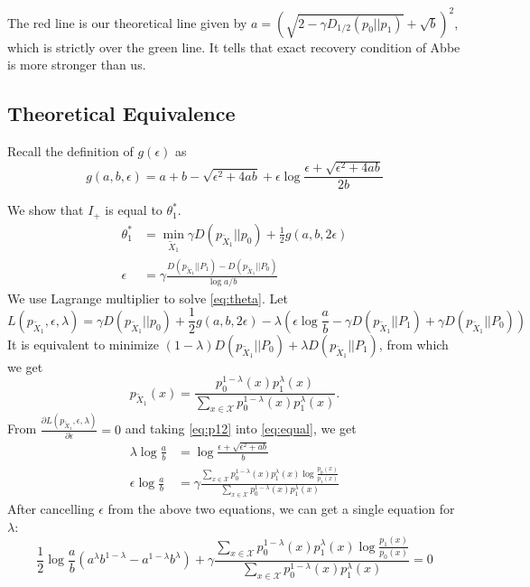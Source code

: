 \documentclass{article}
\begin{document}
The red line is our theoretical line
given by $a=(\sqrt{2 - \gamma D_{1/2}(p_0||p_1)} + \sqrt{b})^2$,
which is strictly over the green line. It tells that
exact recovery condition of Abbe is more stronger than us.
\subsection{Theoretical Equivalence}
Recall the definition of $g(\epsilon)$ as
	\begin{equation}\label{eq:gab}
	g(a,b,\epsilon) = a + b - \sqrt{\epsilon^2 + 4ab} + \epsilon \log \frac{\epsilon + \sqrt{\epsilon^2 + 4ab}}{2b}
	\end{equation}
	
We show that $I_+$ is equal to $\theta_1^*$.
\begin{align}
\theta^*_1 &= \min_{\widetilde{X}_1} \gamma D(p_{\widetilde{X}_1}|| p_0)+ \frac{1}{2} g(a,b, 2\epsilon)  \label{eq:theta}\\
\epsilon &= \gamma \frac{D(p_{\widetilde{X}_1} || P_1) - D(p_{\widetilde{X}_1} || P_0) }{\log a /b}\label{eq:equal}
\end{align}
We use Lagrange multiplier to solve \eqref{eq:theta}.
Let
$$
L(p_{\widetilde{X}_1},\epsilon, \lambda)
=\gamma D(p_{\widetilde{X}_1}|| p_0)+ \frac{1}{2} g(a,b, 2\epsilon) - \lambda(\epsilon \log\frac{a}{b}-\gamma
D(p_{\widetilde{X}_1} || P_1) + \gamma D(p_{\widetilde{X}_1} || P_0))
$$
It is equivalent to minimize
$(1-\lambda)D(p_{\widetilde{X}_1} || P_0) +
\lambda D(p_{\widetilde{X}_1} || P_1) $, from
which we get
\begin{equation}\label{eq:p12}
p_{\widetilde{X}_1}(x) = \frac{p_0^{1-\lambda}(x)p_1^{\lambda}(x)}{\sum_{x \in \mathcal{X}}p_0^{1-\lambda}(x) p_1^{\lambda} (x)}.
\end{equation}
From $\frac{\partial L(p_{\widetilde{X}_1},\epsilon, \lambda)}{\partial \epsilon}=0$ and taking \eqref{eq:p12}
into \eqref{eq:equal}, we get
\begin{align*}
    \lambda \log \frac{a}{b}
    & = \log \frac{\epsilon + \sqrt{\epsilon^2+ab}}{b} \\
    \epsilon \log \frac{a}{b}
    & = \gamma\frac{\sum_{x \in \mathcal{X}}p_0^{1-\lambda}(x) p_1^{\lambda} (x)\log \frac{p_0(x)}{p_1(x)}}{\sum_{x \in \mathcal{X}}p_0^{1-\lambda}(x) p_1^{\lambda} (x)}
\end{align*}
After cancelling $\epsilon$
from the above two equations, we can get a single equation
for $\lambda$:
\begin{equation}
    \frac{1}{2}\log\frac{a}{b}
    (a^{\lambda} b^{1-\lambda}
    -a^{1-\lambda} b^{\lambda})
    + \gamma \frac{\sum_{x \in \mathcal{X}}p_0^{1-\lambda}(x) p_1^{\lambda} (x)\log \frac{p_1(x)}{p_0(x)}}{\sum_{x \in \mathcal{X}}p_0^{1-\lambda}(x) p_1^{\lambda} (x)}=0
\end{equation}
\end{document}
